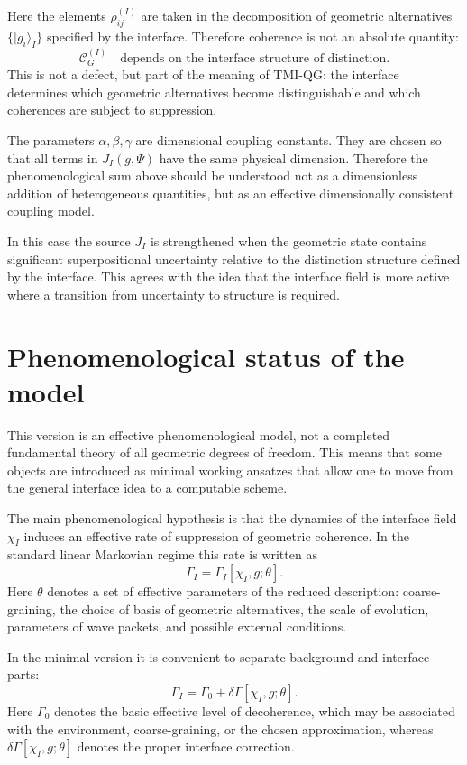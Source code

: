 \documentclass[12pt,a4paper]{article}
\begin{document}
Here the elements $\rho_{ij}^{(I)}$ are taken in the decomposition of geometric alternatives $\{|g_i\rangle_I\}$ specified by the interface. Therefore coherence is not an absolute quantity:
\[
\boxed{
\mathcal C_G^{(I)}
\quad\text{depends on the interface structure of distinction.}
}
\]
This is not a defect, but part of the meaning of TMI-QG: the interface determines which geometric alternatives become distinguishable and which coherences are subject to suppression.

The parameters $\alpha,\beta,\gamma$ are dimensional coupling constants. They are chosen so that all terms in $J_I(g,\Psi)$ have the same physical dimension. Therefore the phenomenological sum above should be understood not as a dimensionless addition of heterogeneous quantities, but as an effective dimensionally consistent coupling model.

In this case the source $J_I$ is strengthened when the geometric state contains significant superpositional uncertainty relative to the distinction structure defined by the interface. This agrees with the idea that the interface field is more active where a transition from uncertainty to structure is required.

\section{Phenomenological status of the model}

This version is an effective phenomenological model, not a completed fundamental theory of all geometric degrees of freedom. This means that some objects are introduced as minimal working ansatzes that allow one to move from the general interface idea to a computable scheme.

The main phenomenological hypothesis is that the dynamics of the interface field $\chi_I$ induces an effective rate of suppression of geometric coherence. In the standard linear Markovian regime this rate is written as
\[
\boxed{
\Gamma_I=\Gamma_I[\chi_I,g;\theta].
}
\]
Here $\theta$ denotes a set of effective parameters of the reduced description: coarse-graining, the choice of basis of geometric alternatives, the scale of evolution, parameters of wave packets, and possible external conditions.

In the minimal version it is convenient to separate background and interface parts:
\[
\boxed{
\Gamma_I
=
\Gamma_0
+
\delta\Gamma[\chi_I,g;\theta].
}
\]
Here $\Gamma_0$ denotes the basic effective level of decoherence, which may be associated with the environment, coarse-graining, or the chosen approximation, whereas $\delta\Gamma[\chi_I,g;\theta]$ denotes the proper interface correction.
\end{document}

